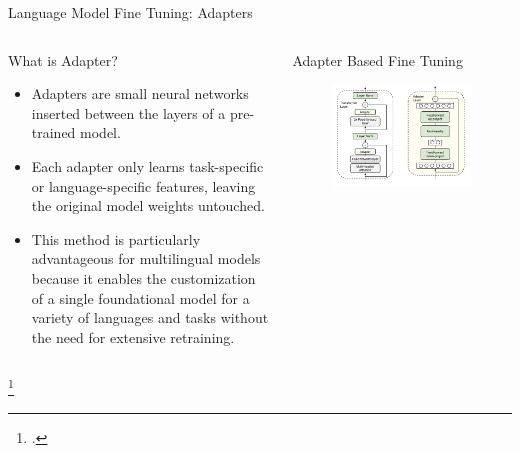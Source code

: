 \documentclass{beamer}
\begin{document}
	\begin{frame}{Language Model Fine Tuning: Adapters}
		\begin{columns}
			\begin{block}{\scriptsize What is Adapter?}\scriptsize
				\begin{itemize}
					\item Adapters are small neural networks inserted between the layers of a pre-trained model.
					\item Each adapter only learns task-specific or language-specific features, leaving the original model weights untouched.
					\item This method is particularly advantageous for multilingual models because it enables the customization of a single foundational model for a variety of languages and tasks without the need for extensive retraining. 
				\end{itemize}		  
			\end{block}
			\begin{block}{\scriptsize Adapter Based Fine Tuning\footnotemark}
				\begin{figure}
					\centering
					\includegraphics[width=\textwidth]{adapter}
				\end{figure}
			\end{block}
		\end{columns}\footcitetext{houlsby2019parameter}
	\end{frame}
	
\end{document}
